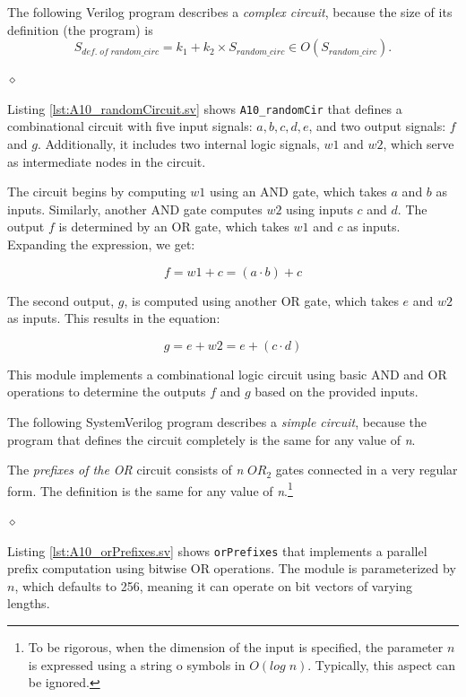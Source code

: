 \begin{exemplu}
The following Verilog program describes a {\em complex circuit},
because the size of its definition (the program) is
$$S_{def. \; of \; random\_circ} = k_{1} + k_{2} \times
S_{random\_circ} \in O(S_{random\_circ}).$$
{\em 
{}
}

$\diamond$
\end{exemplu}
Listing \ref{lst:A10_randomCircuit.sv} shows \texttt{A10\_randomCir} that defines a combinational circuit with five input signals: \( a, b, c, d, e \), and two output signals: \( f \) and \( g \). Additionally, it includes two internal logic signals, \( w1 \) and \( w2 \), which serve as intermediate nodes in the circuit.

The circuit begins by computing \( w1 \) using an AND gate, which takes \( a \) and \( b \) as inputs. Similarly, another AND gate computes \( w2 \) using inputs \( c \) and \( d \). 
The output \( f \) is determined by an OR gate, which takes \( w1 \) and \( c \) as inputs. Expanding the expression, we get:

\[
f = w1 + c = (a \cdot b) + c
\]

The second output, \( g \), is computed using another OR gate, which takes \( e \) and \( w2 \) as inputs. This results in the equation:

\[
g = e + w2 = e + (c \cdot d)
\]

This module implements a combinational logic circuit using basic AND and OR operations to determine the outputs \( f \) and \( g \) based on the provided inputs.


\begin{exemplu}
The following SystemVerilog program describes a {\em simple circuit},
because the program that defines the circuit completely is the same
for any value of {\em n}.

{\em
{}
                    }

The {\em prefixes of the OR} circuit consists of {\em n} $OR_{2}$ gates
connected in a very regular form. The definition is the same for
any value of {\em n}.\footnote{To be rigorous, when the
dimension of the input is specified, the
parameter $n$ is expressed using a string o symbols in $O(log \;
n)$. Typically, this aspect can be ignored.}

$\diamond$
\end{exemplu}
Listing \ref{lst:A10_orPrefixes.sv} shows \texttt{orPrefixes} that implements a parallel prefix computation using bitwise OR operations. The module is parameterized by \( n \), which defaults to 256, meaning it can operate on bit vectors of varying lengths.

